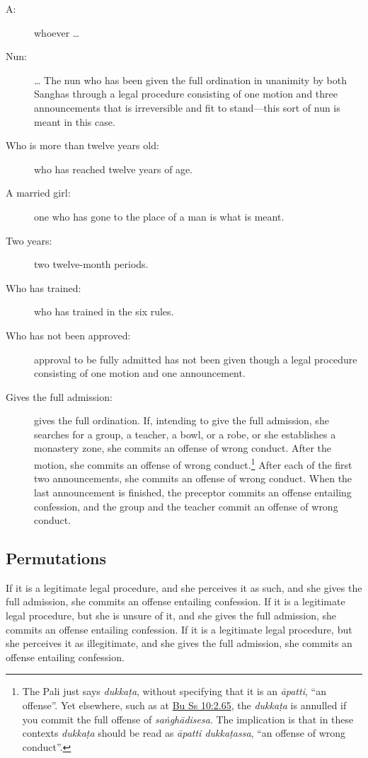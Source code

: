 \documentclass[12pt,openany]{book}%
\begin{document}
\begin{description}%
\item[A: ] whoever … %
\item[Nun: ] … The nun who has been given the full ordination in unanimity by both Sanghas through a legal procedure consisting of one motion and three announcements that is irreversible and fit to stand—this sort of nun is meant in this case. %
\item[Who is more than twelve years old: ] who has reached twelve years of age. %
\item[A married girl: ] one who has gone to the place of a man is what is meant. %
\item[Two years: ] two twelve-month periods. %
\item[Who has trained: ] who has trained in the six rules. %
\item[Who has not been approved: ] approval to be fully admitted has not been given though a legal procedure consisting of one motion and one announcement. %
\item[Gives the full admission: ] gives the full ordination. If, intending to give the full admission, she searches for a group, a teacher, a bowl, or a robe, or she establishes a monastery zone, she commits an offense of wrong conduct. After the motion, she commits an offense of wrong conduct.\footnote{The Pali just says \textit{\textsanskrit{dukkaṭa}}, without specifying that it is an \textit{\textsanskrit{āpatti}}, “an offense”. Yet elsewhere, such as at \href{https://suttacentral.net/pli-tv-bu-vb-ss10/en/brahmali\#2.65}{Bu Ss 10:2.65}, the \textit{\textsanskrit{dukkaṭa}} is annulled if you commit the full offense of \textit{\textsanskrit{saṅghādisesa}}. The implication is that in these contexts \textit{\textsanskrit{dukkaṭa}} should be read as \textit{\textsanskrit{āpatti} \textsanskrit{dukkaṭassa}}, “an offense of wrong conduct”. } After each of the first two announcements, she commits an offense of wrong conduct. When the last announcement is finished, the preceptor commits an offense entailing confession, and the group and the teacher commit an offense of wrong conduct. %
\end{description}

\subsection*{Permutations }

If it is a legitimate legal procedure, and she perceives it as such, and she gives the full admission, she commits an offense entailing confession. If it is a legitimate legal procedure, but she is unsure of it, and she gives the full admission, she commits an offense entailing confession. If it is a legitimate legal procedure, but she perceives it as illegitimate, and she gives the full admission, she commits an offense entailing confession. 
\end{document}
